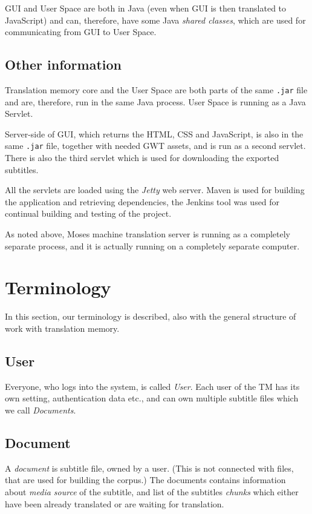 GUI and User Space are both in Java (even when GUI is then translated to JavaScript) and can, therefore, have some Java \emph{shared classes}, which are used for communicating from GUI to User Space.

\subsection*{Other information}
Translation memory core and the User Space are both parts of the same \texttt{.jar} file and are, therefore, run in the same Java process. User Space is running as a Java Servlet.

Server-side of GUI, which returns the HTML, CSS and JavaScript, is also in the same \texttt{.jar} file, together with needed GWT assets, and is run as a second servlet. There is also the third servlet which is used for downloading the exported subtitles.

All the servlets are loaded using the \emph{Jetty} web server. Maven is used for building the application and retrieving dependencies, the Jenkins tool was used for continual building and testing of the project.

As noted above, Moses machine translation server is running as a completely separate process, and it is actually running on a completely separate computer.

\section{Terminology}
\label{sec:shared_structure}

In this section, our terminology is described, also with the general structure of work with translation memory.

\subsection*{User}
Everyone, who logs into the system, is called \emph{User}. Each user of the TM has its own setting, authentication data etc., and can own multiple subtitle files which we call \emph{Documents}.

\subsection*{Document}
A \emph{document} is subtitle file, owned by a user. (This is not connected with files, that are used for building the corpus.) The documents contains information about \emph{media source} of the subtitle, and list of the subtitles \emph{chunks} which either have been already translated or are waiting for translation.

